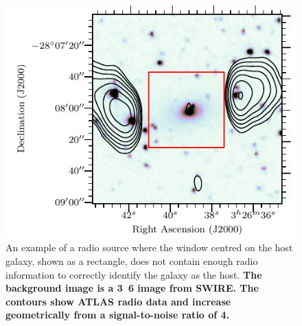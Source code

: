 \documentclass[fleqn,usenatbib,usedcolumn]{mnras}
\newcommand{\edited}[1]{{\bf {#1}}}
\begin{document}
    \begin{figure}
      \centering
      \includegraphics[width=\linewidth]{images/CI2363_fig.pdf}
      \caption{An example of a radio source where the window centred on the
        host galaxy, shown as a rectangle, does not contain enough radio
        information to correctly identify the galaxy as the host. \edited{The background image
        is a \unit{3.6}{\micro\meter} image from SWIRE. The contours show ATLAS radio
        data and increase geometrically from a signal-to-noise ratio of 4.}}
      \label{fig:broken-window-size}
    \end{figure}
\end{document}
